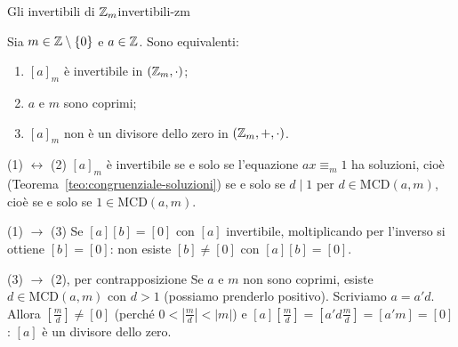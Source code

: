 \begin{concetto}
\begin{Corollario}{Gli invertibili di $\mathbb{Z}_m$}{invertibili-zm}
    \begin{prerequisiti}
    \end{prerequisiti}
    Sia $m \in \mathbb{Z} \setminus \{0\}$ e $a \in \mathbb{Z}$. Sono equivalenti:
    \begin{enumerate}
        \item $[a]_m$ è invertibile in $(\mathbb{Z}_m, \cdot)$;
        \item $a$ e $m$ sono coprimi;
        \item $[a]_m$ non è un divisore dello zero in $(\mathbb{Z}_m, +, \cdot)$.
    \end{enumerate}
\end{Corollario}
\begin{dimostrazione}
    \begin{caso}{(1) $\leftrightarrow$ (2)}
        $[a]_m$ è invertibile se e solo se l'equazione $ax \equiv_m 1$ ha soluzioni, cioè (Teorema~\ref{teo:congruenziale-soluzioni}) se e solo se
        $d \mid 1$ per $d \in \mathrm{MCD}(a, m)$, cioè se e solo se $1 \in \mathrm{MCD}(a, m)$.
    \end{caso}
    \begin{caso}{(1) $\rightarrow$ (3)}
        Se $[a][b] = [0]$ con $[a]$ invertibile, moltiplicando per l'inverso si ottiene $[b] = [0]$: non esiste $[b] \neq [0]$ con $[a][b] = [0]$.
    \end{caso}
    \begin{caso}{(3) $\rightarrow$ (2), per contrapposizione}
        Se $a$ e $m$ non sono coprimi, esiste $d \in \mathrm{MCD}(a, m)$ con $d > 1$ (possiamo prenderlo positivo). Scriviamo $a = a'd$. Allora
        $[\frac{m}{d}] \neq [0]$ (perché $0 < |\frac{m}{d}| < |m|$) e $[a][\frac{m}{d}] = [a'd\frac{m}{d}] = [a'm] = [0]$: $[a]$ è un divisore dello zero.
    \end{caso}
\end{dimostrazione}
\end{concetto}

